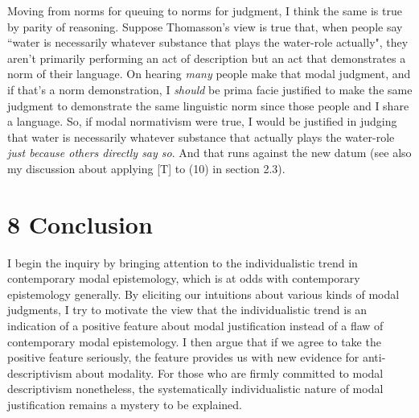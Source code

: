 \documentclass[a4paper,12pt]{article}
\begin{document}
Moving from norms for queuing to norms for judgment, I think the same is true by parity of reasoning. Suppose Thomasson's view is true that, when people say ``water is necessarily whatever substance that plays the water-role actually", they aren't primarily performing an act of description but an act that demonstrates a norm of their language. On hearing \emph{many} people make that modal judgment, and if that's a norm demonstration, I \emph{should} be prima facie justified to make the same judgment to demonstrate the same linguistic norm since those people and I share a language. So, if modal normativism were true, I would be justified in judging that water is necessarily whatever substance that actually plays the water-role \emph{just because others directly say so}. And that runs against the new datum (see also my discussion about applying [T] to (10) in section 2.3).

\section*{8 Conclusion}

I begin the inquiry by bringing attention to the individualistic trend in contemporary modal epistemology, which is at odds with contemporary epistemology generally. By eliciting our intuitions about various kinds of modal judgments, I try to motivate the view that the individualistic trend is an indication of a positive feature about modal justification instead of a flaw of contemporary modal epistemology. I then argue that if we agree to take the positive feature seriously, the feature provides us with new evidence for anti-descriptivism about modality. For those who are firmly committed to modal descriptivism nonetheless, the systematically individualistic nature of modal justification remains a mystery to be explained.
\end{document}
